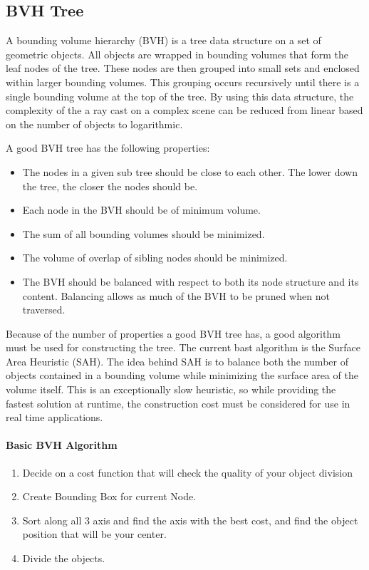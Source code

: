 \subsection{BVH Tree}
 A bounding volume hierarchy (BVH) is a tree data structure on a set of geometric objects.
 All objects are wrapped in bounding volumes that form the leaf nodes of the tree.
 These nodes are then grouped into small sets and enclosed within larger bounding volumes.
 This grouping occurs recursively until there is a single bounding volume at the top of the tree.
 By using this data structure, the complexity of the a ray cast on a complex scene can be reduced from linear based on the number of objects to logarithmic.
 
 A good BVH tree has the following properties:
 \begin{itemize}
 \item The nodes in a given sub tree should be close to each other. The lower down the tree, the closer the nodes should be.
 \item Each node in the BVH should be of minimum volume.
 \item The sum of all bounding volumes should be minimized.
 \item The volume of overlap of sibling nodes should be minimized.
 \item The BVH should be balanced with respect to both its node structure and its content. Balancing allows as much of the BVH to be pruned when not traversed.
 \end{itemize}
Because of the number of properties a good BVH tree has, a good algorithm must be used for constructing the tree.
The current bast algorithm is the Surface Area Heuristic (SAH).
The idea behind SAH is to balance both the number of objects contained in a bounding volume while minimizing the surface area of the volume itself.
This is an exceptionally slow heuristic, so while providing the fastest solution at runtime, the construction cost must be considered for use in real time applications.

\paragraph{Basic BVH Algorithm}
\begin{enumerate}
\item Decide on a cost function that will check the quality of your object division
\item Create Bounding Box for current Node.
\item Sort along all 3 axis and find the axis with the best cost, and find the object position that will be your center.
\item Divide the objects.
\end{enumerate}

